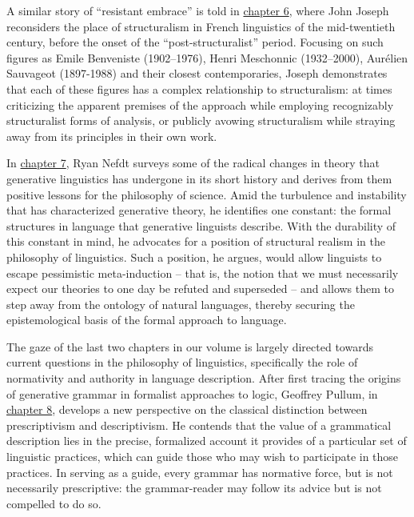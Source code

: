 \documentclass[output=paper]{langscibook}
\begin{document}
A similar story of ``resistant embrace'' is told in \hyperref[chap:joseph]{chapter 6}, where John Joseph reconsiders the place of structuralism in French linguistics of the mid-twentieth century, before the onset of the ``post-structuralist'' period. Focusing on such figures as Emile Benveniste (1902–1976), Henri Meschonnic (1932–2000), Aurélien Sauvageot (1897-1988) and their closest contemporaries, Joseph demonstrates that each of these figures has a complex relationship to structuralism: at times criticizing the apparent premises of the approach while employing recognizably structuralist forms of analysis, or publicly avowing structuralism while straying away from its principles in their own work.

In \hyperref[chap:nefdt]{chapter 7}, Ryan Nefdt surveys some of the radical changes in theory that generative linguistics has undergone in its short history and derives from them positive lessons for the philosophy of science. Amid the turbulence and instability that has characterized generative theory, he identifies one constant: the formal structures in language that generative linguists describe. With the durability of this constant in mind, he advocates for a position of structural realism in the philosophy of linguistics. Such a position, he argues, would allow linguists to escape pessimistic meta-induction – that is, the notion that we must necessarily expect our theories to one day be refuted and superseded – and allows them to step away from the ontology of natural languages, thereby securing the epistemological basis of the formal approach to language.

The gaze of the last two chapters in our volume is largely directed towards current questions in the philosophy of linguistics, specifically the role of normativity and authority in language description. After first tracing the origins of generative grammar in formalist approaches to logic, Geoffrey Pullum, in \hyperref[chap:pullum]{chapter 8}, develops a new perspective on the classical distinction between prescriptivism and descriptivism. He contends that the value of a grammatical description lies in the precise, formalized account it provides of a particular set of linguistic practices, which can guide those who may wish to participate in those practices. In serving as a guide, every grammar has normative force, but is not necessarily prescriptive: the grammar-reader may follow its advice but is not compelled to do so.
\end{document}
